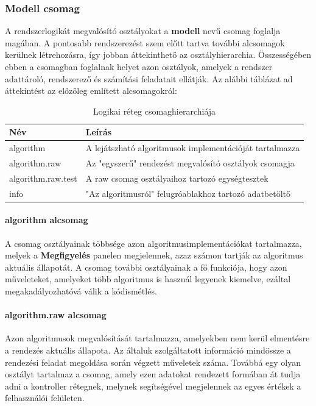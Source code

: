 \documentclass{elteikthesis}
\begin{document}
\subsubsection{Modell csomag}
A rendszerlogikát megvalósító osztályokat a \textbf{modell} nevű csomag foglalja magában. A pontosabb rendszerezést szem előtt tartva további alcsomagok kerülnek létrehozásra, így jobban áttekinthető az osztályhierarchia. Összességében ebben a csomagban foglalnak helyet azon osztályok, amelyek a rendszer adattároló, rendszerező és számítási feladatait ellátják. Az alábbi táblázat ad áttekintést az előzőleg említett alcsomagokról:\par
\begin{table}[H]
	\def\arraystretch{2}
	\centering
	\begin{tabular}{|l|l|}
		\hline
		\textbf{Név}  & \textbf{Leírás}                                                                          \\ \hline
		algorithm     & A lejátszható algoritmusok implementációját tartalmazza                       \\ \hline
		algorithm.raw & Az "egyszerű" rendezést megvalósító osztályok csomagja\\ \hline
		algorithm.raw.test & A raw csomag osztályaihoz tartozó egységtesztek\\ \hline
		info         & "Az algoritmusról" felugróablakhoz tartozó adatbetöltő                         \\ \hline
	\end{tabular}
	\caption{Logikai réteg csomaghierarchiája}
\end{table}
\paragraph{algorithm alcsomag}
A csomag osztályainak többsége azon algoritmusimplementációkat tartalmazza, melyek a \textbf{Megfigyelés} panelen megjelennek, azaz számon tartják az algoritmus aktuális állapotát. A csomag további osztályainak a fő funkciója, hogy azon műveleteket, amelyeket több algoritmus is használ legyenek kiemelve, ezáltal megakadályozhatóvá válik a kódismétlés.
\paragraph{algorithm.raw alcsomag}
Azon algoritmusok megvalósítását tartalmazza, amelyekben nem kerül elmentésre a rendezés aktuális állapota. Az általuk szolgáltatott információ mindössze a rendezési feladat megoldása során végzett műveletek száma. Továbbá egy olyan osztályt tartalmaz a csomag, amely ezen adatokat rendezett formában át tudja adni a kontroller rétegnek, melynek segítségével megjelennek az egyes értékek a felhasználói felületen.
\end{document}
